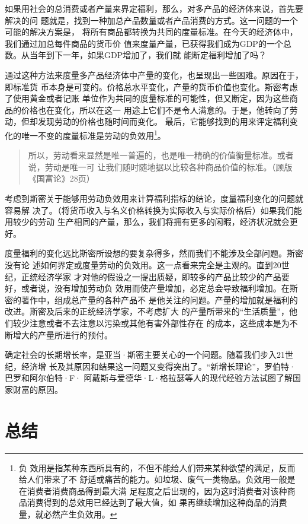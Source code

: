 如果用社会的总消费或者产量来界定福利，那么，对多产品的经济体来说，首先要解决的问
题就是，找到一种加总产品数量或者产品消费的方式。这一问题的一个可能的解决方案是，
将所有商品都转换为共同的度量标准。在今天的经济体中，我们通过加总每件商品的货币价
值来度量产量，已获得我们成为GDP的一个总数。从当年到下一年，如果GDP增加了，我们就
能断定福利增加了吗？

通过这种方法来度量多产品经济体中产量的变化，也呈现出一些困难。原因在于，即标准货
币本身是可变的。价格总水平变化，产量的货币价值也变化。斯密考虑了使用黄金或者记账
单位作为共同的度量标准的可能性，但又断定，因为这些商品的价格也在变化，所以在这一
用途上它们不是令人满意的。于是，他转向了劳动，但却发现劳动的价格也随时间而变化。
最后，它能够找到的用来评定福利变化的唯一不变的度量标准是劳动的负效用\footnote{负
  效用是指某种东西所具有的，不但不能给人们带来某种欲望的满足，反而给人们带来了不
  舒适或痛苦的能力。如垃圾、废气一类物品。负效用一般是在消费者消费商品得到最大满
  足程度之后出现的，因为这时消费者对该种商品消费得到的总效用已经达到了最大值，如
  果再继续增加这种商品的消费量，就必然产生负效用。}。

\begin{quotation}
所以，劳动看来显然是唯一普遍的，也是唯一精确的价值衡量标准。或者说，劳动是唯一可
让我们随时随地据以比较各种商品价值的标准。（顾版《国富论》28页）
\end{quotation}

 考虑到斯密关于能够用劳动负效用来计算福利指标的结论，度量福利变化的问题就容易解
 决了。（将货币收入与名义价格转换为实际收入与实际价格后）如果我们能用较少的劳动
 生产相同的产量，那么，我们将拥有更多的闲暇，经济状况就会更好。

 度量福利的变化远比斯密所设想的要复杂得多，然而我们不能涉及全部问题。斯密没有论
 述如何界定或度量劳动的负效用。这一点看来完全是主观的。直到20世纪，正统经济学家
 才对他的假设之一提出质疑，即较多的产品比较少的产品要好，或者说，没有增加劳动负
 效用而使产量增加，必定总会导致福利增加。在斯密的著作中，组成总产量的各种产品不
 是他关注的问题。产量的增加就是福利的改进。斯密及后来的正统经济学家，不考虑扩大
 的产量所带来的“生活质量”，他们较少注意或者不去注意以污染或其他有害外部性存在
 的成本，这些成本是为不断增大的产量所进行的预付。

 确定社会的长期增长率，是亚当·斯密主要关心的一个问题。随着我们步入21世纪，经济增
 长及其原因和结果这一问题又变得突出了。“新增长理论”，罗伯特·巴罗和阿尔伯特·F·
 阿戴斯与爱德华·L·格拉瑟等人的现代经验方法试图了解国家财富的原因。

 \section{总结}

